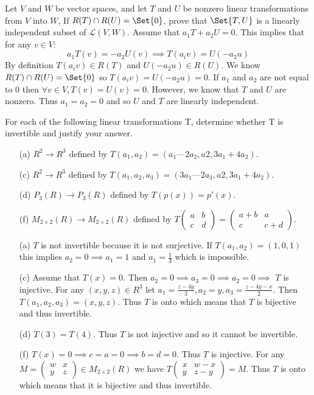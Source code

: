 \documentclass[paper=a4, fontsize=11pt]{jhwhw} %
\begin{document}
Let $V$ and $W$ be vector spaces, and let $T$ and $U$ be nonzero linear
transformations from $V$ into $W$, If $R(T) \cap R(U) = \Set{0}$, prove that
$\Set{T, U}$ is a linearly independent subset of $\mathcal L(V, W)$.
\solution
Assume that $a_1T + a_2U = 0$. This implies that for any $v\in V$:
$$a_1T(v) = - a_2U(v) \implies T(a_iv) = U(-a_2u)$$
By definition $T(a_iv) \in R(T)$ and $U(-a_2u)\in R(U)$. We know $R(T) \cap R(U) = \Set{0}$ so $T(a_iv) = U(-a_2u) = 0$. If $a_1$ and $a_2$ are not equal to 0 then $\forall v\in V, T(v) = U(v) = 0$. However, we know that $T$ and $U$ are nonzero. Thus $a_1 = a_2 = 0$ and so $U$ and $T$ are linearly independent. 

For each of the following linear transformations T, determine whether
T is invertible and justify your answer.
\begin{itemize}
    \item [(a)] $R^2 \to R^3$ defined by $T(a_1,a_2) = (a_1 — 2a_2,a2,3a_1 + 4a_2)$.
    \item [(c)] $R^2 \to R^3$ defined by $T(a_1,a_2,a_3) = (3a_1 — 2a_3,a2,3a_1 + 4a_2)$.
    \item [(d)] $P_3(R)\to P_3(R)$ defined by $T(p(x)) = p'(x)$.
    \item [(f)] $M_{2\times 2}(R) \to M_{2\times 2}(R)$ defined by $T(\begin{smallmatrix} a&b\\ c&d \end{smallmatrix}) = \left (\begin{smallmatrix} a+b&a\\ c&c+d \end{smallmatrix}\right )$.
\end{itemize}
\solution
\begin{itemize}
    \item [(a)] $T$ is not invertible because it is not surjective. If $T(a_1, a_2) = (1, 0, 1)$ this implies $a_2 = 0 \implies a_1 = 1$ and $a_1 = \frac{1}{3}$ which is impossible.
    \item [(c)] Assume that $T(x) = 0$. Then $a_2 = 0 \implies a_3 = 0 \implies a_2 = 0 \implies$ $T$ is injective. For any $(x, y, z)\in R^3$ let $a_1 = \frac{z - 4y}{3}, a_2 = y, a_3 = \frac{z-4y-x}{2}$. Then $T(a_1, a_2, a_3) = (x, y, z)$. Thus $T$ is onto which means that $T$ is bijective and thus invertible. 
    \item [(d)] $T(3) = T(4)$. Thus $T$ is not injective and so it cannot be invertible. 
\item [(f)] $T(x) = 0 \implies c = a = 0 \implies b = d = 0$. Thus $T$ is injective. For any $M = \left (\begin{smallmatrix} w&x\\ y&z \end{smallmatrix}\right ) \in M_{2\times 2}(R)$ we have $T(\begin{smallmatrix} x&w-x\\ y&z-y \end{smallmatrix}) = M$. Thus $T$ is onto which means that it is bijective and thus invertible. 
\end{itemize}
\end{document}
